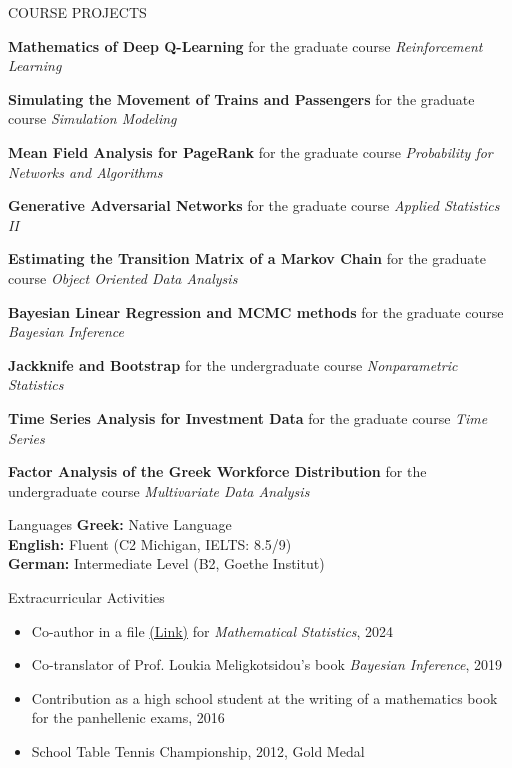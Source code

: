 \documentclass{resume} %
\begin{document}

\begin{rSection}{COURSE PROJECTS}
\vspace{-1.25em}
\item \textbf{Mathematics of Deep Q-Learning} {for the graduate course \textit{Reinforcement Learning}}
\item \textbf{Simulating the Movement of Trains and Passengers} for the graduate course \textit{Simulation Modeling}
\item \textbf{Mean Field Analysis for PageRank} {for the graduate course \textit{Probability for Networks and Algorithms}}
\item \textbf{Generative Adversarial Networks} {for the graduate course \textit{Applied Statistics II}}
\item \textbf{Estimating the Transition Matrix of a Markov Chain} {for the graduate course \textit{Object Oriented Data Analysis}}
\item \textbf{Bayesian Linear Regression and MCMC methods} {for the graduate course \textit{Bayesian Inference}}
\item \textbf{Jackknife and Bootstrap} {for the undergraduate course \textit{Nonparametric Statistics}}
\item \textbf{Time Series Analysis for Investment Data} {for the graduate course \textit{Time Series}}
\item \textbf{Factor Analysis of the Greek Workforce Distribution} {for the undergraduate course \textit{Multivariate Data Analysis}}
\end{rSection} 




\begin{rSection}{Languages}
{\bf Greek:} Native Language \\ 
{\bf English:} Fluent (C2 Michigan, IELTS: 8.5/9) \\
{\bf German:} Intermediate Level (B2, Goethe Institut)
\end{rSection}


\begin{rSection}{Extracurricular Activities}
\begin{itemize}
    \item Co-author in a file \href{https://katsianos.github.io/assets/doc/Mathematical%20Statistics.pdf}{(Link)} for \textit{Mathematical Statistics}, 2024
    \item Co-translator of Prof. Loukia Meligkotsidou's book \textit{Bayesian Inference}, 2019 
\item Contribution as a high school student at the writing of a mathematics book for the panhellenic exams, 2016
\item School Table Tennis Championship, 2012, Gold Medal
\end{itemize}
\end{rSection}
\end{document}
